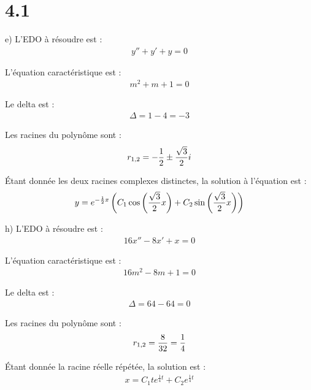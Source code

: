 \section*{4.1}

e) L'EDO à résoudre est :
\begin{align*}
    y'' + y' + y = 0
\end{align*}

L'équation caractéristique est :
\begin{align*}
    m^2 + m + 1 = 0
\end{align*}

Le delta est :
\begin{align*}
    \Delta = 1-4 = -3
\end{align*}

Les racines du polynôme sont :
\begin{align*}
    r_{1,2} = -\dfrac{1}{2}\pm\dfrac{\sqrt{3}}{2}i
\end{align*}

Étant donnée les deux racines complexes distinctes, la solution à l'équation
est :
\begin{align*}
    y = e^{-\frac{1}{2}x}\left({C_1\cos\left({\dfrac{\sqrt{3}}{2}x}\right) +
    C_2\sin\left({\dfrac{\sqrt{3}}{2}x}\right)}\right)
\end{align*}

h) L'EDO à résoudre est :
\begin{align*}
    16x'' - 8x' + x = 0
\end{align*}

L'équation caractéristique est :
\begin{align*}
    16m^2 - 8m + 1 = 0
\end{align*}

Le delta est :
\begin{align*}
    \Delta = 64-64 = 0
\end{align*}

Les racines du polynôme sont :
\begin{align*}
    r_{1,2} = \dfrac{8}{32} = \dfrac{1}{4}
\end{align*}

Étant donnée la racine réelle répétée, la solution est :
\begin{align*}
    x = C_1 t e^{\frac{1}{4}t} +C_2 e^{\frac{1}{4}t}
\end{align*}
